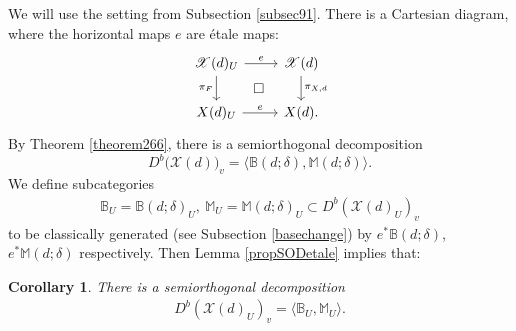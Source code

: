 \documentclass [11pt,oneside,a4paper,mathscr]{amsart}
\newtheorem{cor}[thm]{Corollary}
\theoremstyle{definition}
\newtheorem{remark}[thm]{Remark}
\newcommand{\X}{\mathscr{X}}
\newcommand{\ssslash}{/\!\!/}
\begin{document}
We will use the setting from Subsection \ref{subsec91}. 
There is a Cartesian diagram, where the horizontal maps $e$ are étale maps:
\begin{equation}\label{dia:Fe}
    \begin{tikzcd}
        \mathscr{X}(d)_U\arrow[dr, phantom, "\square"]\arrow[d, "\pi_F"']\arrow[r, "e"]& \X(d)\arrow[d,"\pi_{X,d}"]\\
        X(d)_U\arrow[r, "e"]& X(d).
    \end{tikzcd}
\end{equation}
By Theorem \ref{theorem266}, there is a semiorthogonal decomposition 
\begin{equation}\label{SODBM}
D^b\big(\X(d)\big)_v=\big\langle \mathbb{B}(d; \delta), \mathbb{M}(d; \delta)\big\rangle.
\end{equation}
We define subcategories 
\begin{align*}\mathbb{B}_U=\mathbb{B}(d; \delta)_U, \ 
\mathbb{M}_U=\mathbb{M}(d; \delta)_U \subset D^b(\mathscr{X}(d)_U)_v
\end{align*}to be 
classically generated (see Subsection \ref{basechange}) by $e^{\ast}\mathbb{B}(d; \delta)$, $e^{\ast}\mathbb{M}(d; \delta)$ respectively. 
Then Lemma \ref{propSODetale} implies that:





\begin{cor}\label{prop615}
There is a semiorthogonal decomposition
\begin{align}\label{sod:U}
D^b(\mathscr{X}(d)_U)_v=\langle \mathbb{B}_U, \mathbb{M}_U\rangle.
\end{align}
\end{cor}



\end{document}
